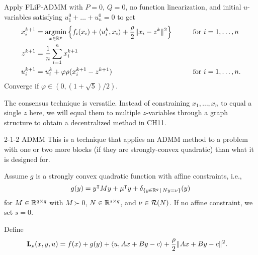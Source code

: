 \documentclass[10pt,mathserif]{beamer}
\begin{document}
\begin{frame}

Apply FLiP-ADMM with $P=0$, $Q=0$, no function linearization, and initial $u$-variables satisfying  $u^0_1+\dots+u^0_n=0$ to get
\begin{alignat*}{3}
x^{k+1}_i&=\operatorname*{argmin}_{x\in\mathbb{R}^p}\left\{f_i(x_i)+\langle u^k_i,x_i \rangle+\frac{\rho}{2}\|x_i-z^k\|^2\right\}
&&\qquad\text{for }i=1,\dots,n
\\
z^{k+1}&=\frac{1}{n}\sum^n_{i=1}x_i^{k+1}\\
u^{k+1}_i&=u^k_i+\varphi \rho(x_i^{k+1}-z^{k+1})
&&\qquad\text{for }i=1,\dots,n.
\end{alignat*}
Converge if  $\varphi\in(0,(1+\sqrt{5})/2)$.
\bigskip

The consensus technique is versatile. Instead of constraining $x_1,\dots,x_n$ to equal a single $z$ here, we will equal them to multiple $z$-variables through a graph structure to obtain a decentralized method in CH11.
\end{frame}

\begin{frame}{2-1-2 ADMM}
This is a technique that applies an ADMM method to a problem with one or two more blocks (if they are strongly-convex quadratic) than what it is designed for.
\bigskip

Assume $g$ is a strongly convex quadratic function with affine constraints, i.e.,
\[
g(y)=y^\intercal  My+\mu^\intercal y+\delta_{\{y\in \mathbb{R}^q\,|\,Ny=\nu\}}(y)
\]
for $M\in \mathbb{R}^{q\times q}$ with $M\succ 0$, $N\in\mathbb{R}^{s\times q}$, and $\nu\in{\mathcal{R}}(N)$. If no affine constraint, we set $s=0$.
\bigskip


Define
\begin{align*}
  \mathbf{L}_\rho (x,y,u) & = f(x) + g(y) +\langle u,Ax+By-c\rangle  + \frac{\rho}{2}\|Ax+By-c\|^2.
\end{align*}
\end{frame}
\end{document}
